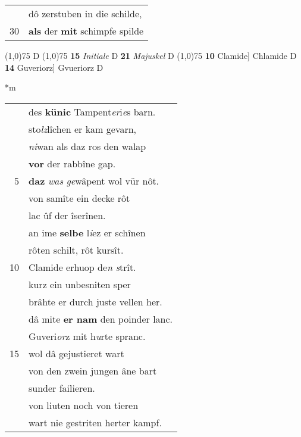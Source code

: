 \documentclass[8pt,a4paper,notitlepage]{article}
\begin{document}
\begin{table}[ht]
\begin{minipage}[t]{0.5\linewidth}
\begin{tabular}{rl}
 & dô zerstuben in die schilde,\\ 
30 & \textbf{als} der \textbf{mit} schimpfe spilde\\ 
\end{tabular}
\scriptsize
\line(1,0){75} \newline
D \newline
\line(1,0){75} \newline
\textbf{15} \textit{Initiale} D  \textbf{21} \textit{Majuskel} D  \newline
\line(1,0){75} \newline
\textbf{10} Clamide] Chlamide D \textbf{14} Guveriorz] Gvueriorz D \newline
\end{minipage}
\hspace{0.5cm}
\begin{minipage}[t]{0.5\linewidth}
\small
\begin{center}*m
\end{center}
\begin{tabular}{rl}
 & des \textbf{künic} Tampent\textit{er}i\textit{e}s barn.\\ 
 & sto\textit{lz}lîchen er kam gevarn,\\ 
 & \textit{ni}wan als daz ros den walap\\ 
 & \textbf{vor} der rabbîne gap.\\ 
5 & \textbf{daz} \textit{was} \textit{ge}wâpent wol vür nôt.\\ 
 & von samîte ein decke rôt\\ 
 & lac ûf der îserînen.\\ 
 & an ime \textbf{selbe} l\textit{i}ez er schînen\\ 
 & rôten schilt, rôt kursît.\\ 
10 & Clamide erhuop de\textit{n} \textit{s}trît.\\ 
 & kurz ein unbesniten sper\\ 
 & brâhte er durch juste vellen her.\\ 
 & dâ mite \textbf{er nam} den poinder lanc.\\ 
 & Guveri\textit{or}z mit h\textit{u}rte spranc.\\ 
15 & wol dâ gejustieret wart\\ 
 & von den zwein jungen âne bart\\ 
 & sunder failieren.\\ 
 & von liuten noch von tieren\\ 
 & wart nie gestriten herter kampf.\\ 

\end{tabular}
\end{minipage}
\end{table}
\end{document}
